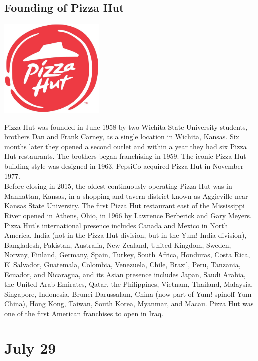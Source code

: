 \documentclass[11pt]{report}
\begin{document}
\subsection{Founding of Pizza Hut}
\vspace{2mm}\begin{center}\includegraphics[width=5cm]{./img/pizzaHutLogo.jpg}\end{center}
Pizza Hut was founded in June 1958 by two Wichita State University students, brothers Dan and Frank Carney, as a single location in Wichita, Kansas. Six months later they opened a second outlet and within a year they had six Pizza Hut restaurants. The brothers began franchising in 1959. The iconic Pizza Hut building style was designed in 1963. PepsiCo acquired Pizza Hut in November 1977.\\ \indent Before closing in 2015, the oldest continuously operating Pizza Hut was in Manhattan, Kansas, in a shopping and tavern district known as Aggieville near Kansas State University. The first Pizza Hut restaurant east of the Mississippi River opened in Athens, Ohio, in 1966 by Lawrence Berberick and Gary Meyers.\\ \indent Pizza Hut's international presence includes Canada and Mexico in North America, India (not in the Pizza Hut division, but in the Yum! India division), Bangladesh, Pakistan, Australia, New Zealand, United Kingdom, Sweden, Norway, Finland, Germany, Spain, Turkey, South Africa, Honduras, Costa Rica, El Salvador, Guatemala, Colombia, Venezuela, Chile, Brazil, Peru, Tanzania, Ecuador, and Nicaragua, and its Asian presence includes Japan, Saudi Arabia, the United Arab Emirates, Qatar, the Philippines, Vietnam, Thailand, Malaysia, Singapore, Indonesia, Brunei Darussalam, China (now part of Yum! spinoff Yum China), Hong Kong, Taiwan, South Korea, Myanmar, and Macau. Pizza Hut was one of the first American franchises to open in Iraq.
\section{July 29}
\end{document}
